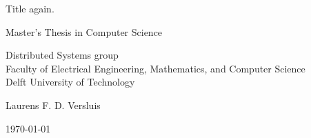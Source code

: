 \begin{titlepage}

  \begin{center}
  \null\vfill
    \begin{center}
    \LARGE{Title again.}
    \end{center}

    \vspace{3cm}

    \begin{large}
    Master's Thesis in Computer Science
    \end{large}

    \vspace{1.5cm}

    \begin{normalsize}
	Distributed Systems group\\
    Faculty of Electrical Engineering, Mathematics, and Computer Science\\
    Delft University of Technology
    \end{normalsize}

    \vspace{2.0cm}

    \begin{normalsize}
    Laurens F. D. Versluis
    \end{normalsize}

    \vspace{1.0cm}

    \today

  \vfill
  \end{center}

\end{titlepage}

